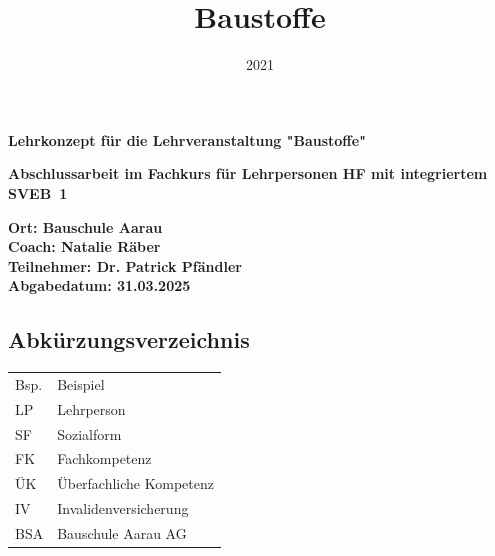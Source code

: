 \documentclass[
11pt,
captions=tableheading,
smallheadings,
headsepline,
footsepline, 
parskip=half-,
]{scrartcl}
\title{Baustoffe}
\date{2021}
\begin{document}
\pagestyle{scrheadings}







{\color{blau_bauschule}\fontsize{40pt}{21pt}\selectfont \textbf{Lehrkonzept für die Lehrveranstaltung "Baustoffe"}}

\vspace{3cm}

{\color{blau_bauschule}\fontsize{31pt}{30pt}\selectfont \textbf{Abschlussarbeit im Fachkurs für Lehrpersonen HF mit integriertem SVEB~1}}

\vspace{2cm}

{\color{blau_bauschule}\fontsize{25pt}{25pt}\selectfont \textbf{
Ort: Bauschule Aarau \\
\vspace{0.4cm}
Coach: Natalie Räber\\
\vspace{0.4cm}
Teilnehmer: Dr. Patrick Pfändler\\
\vspace{0.4cm}
Abgabedatum: 31.03.2025
\vspace{0.4cm}
}}
\vspace{1cm}





\clearpage
\setcounter{tocdepth}{3} %
\tableofcontents%
\clearpage

\subsection*{Abkürzungsverzeichnis}
\begin{table}[H]
    \centering
    \label{tab:abkuerzungen}
    \begin{tabularx}{\textwidth}{@{}ll@{}}
        \toprule
        Bsp. & Beispiel                \\
        LP   & Lehrperson              \\
        SF   & Sozialform              \\
        FK   & Fachkompetenz           \\
        ÜK   & Überfachliche Kompetenz \\
        IV   & Invalidenversicherung \\
        BSA & Bauschule Aarau AG \\
        \bottomrule
    \end{tabularx}
\end{table}
\end{document}
